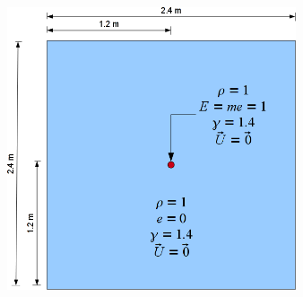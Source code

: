 \documentclass[8pt,xcolor=svgnames]{beamer}
\begin{document}
\begin{frame}
\begin{columns}
\begin{column}{0.3\textwidth}
 \end{column}
 \begin{column}{0.7\textwidth}
    \begin{figure}[h!]
    \centering
    \includegraphics[width=0.8\textwidth,keepaspectratio=true]{./Images/SedovExplosion.png}
    \end{figure}
 \end{column}
\end{columns}
\end{frame}
\end{document}
